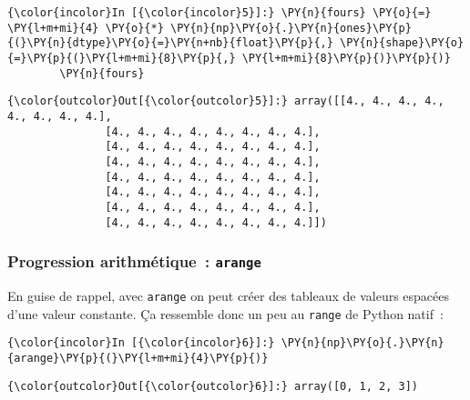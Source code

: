     \begin{Verbatim}[commandchars=\\\{\},frame=single,framerule=0.3mm,rulecolor=\color{cellframecolor}]
{\color{incolor}In [{\color{incolor}5}]:} \PY{n}{fours} \PY{o}{=} \PY{l+m+mi}{4} \PY{o}{*} \PY{n}{np}\PY{o}{.}\PY{n}{ones}\PY{p}{(}\PY{n}{dtype}\PY{o}{=}\PY{n+nb}{float}\PY{p}{,} \PY{n}{shape}\PY{o}{=}\PY{p}{(}\PY{l+m+mi}{8}\PY{p}{,} \PY{l+m+mi}{8}\PY{p}{)}\PY{p}{)}
        \PY{n}{fours}
\end{Verbatim}


\begin{Verbatim}[commandchars=\\\{\},frame=single,framerule=0.3mm,rulecolor=\color{cellframecolor}]
{\color{outcolor}Out[{\color{outcolor}5}]:} array([[4., 4., 4., 4., 4., 4., 4., 4.],
               [4., 4., 4., 4., 4., 4., 4., 4.],
               [4., 4., 4., 4., 4., 4., 4., 4.],
               [4., 4., 4., 4., 4., 4., 4., 4.],
               [4., 4., 4., 4., 4., 4., 4., 4.],
               [4., 4., 4., 4., 4., 4., 4., 4.],
               [4., 4., 4., 4., 4., 4., 4., 4.],
               [4., 4., 4., 4., 4., 4., 4., 4.]])
\end{Verbatim}
            
    \hypertarget{progression-arithmuxe9tique-arange}{%
\subsubsection{\texorpdfstring{Progression arithmétique~:
\texttt{arange}}{Progression arithmétique~: arange}}\label{progression-arithmuxe9tique-arange}}

    En guise de rappel, avec \texttt{arange} on peut créer des tableaux de
valeurs espacées d'une valeur constante. Ça ressemble donc un peu au
\texttt{range} de Python natif~:

    \begin{Verbatim}[commandchars=\\\{\},frame=single,framerule=0.3mm,rulecolor=\color{cellframecolor}]
{\color{incolor}In [{\color{incolor}6}]:} \PY{n}{np}\PY{o}{.}\PY{n}{arange}\PY{p}{(}\PY{l+m+mi}{4}\PY{p}{)}
\end{Verbatim}


\begin{Verbatim}[commandchars=\\\{\},frame=single,framerule=0.3mm,rulecolor=\color{cellframecolor}]
{\color{outcolor}Out[{\color{outcolor}6}]:} array([0, 1, 2, 3])
\end{Verbatim}
            
